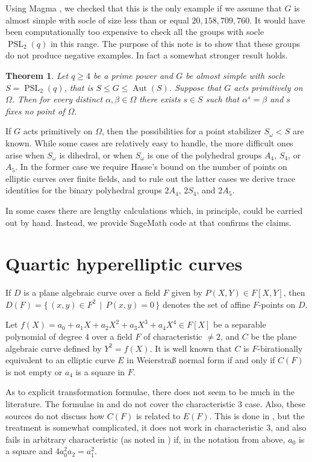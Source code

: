 \documentclass[12pt]{amsart}
\theoremstyle{plain}
\newtheorem{theorem}{Theorem}[section]
\theoremstyle{definition}
\numberwithin{equation}{section}
\newcommand*{\defset}[2]{\{\,#1\,\mid\,#2\,\}}
\DeclareMathOperator{\PSL}{PSL}
\DeclareMathOperator{\aut}{Aut}
\begin{document}
Using Magma \cite{magma}, we checked that this is the only example if
we assume that $G$ is almost simple with socle of size less than or
equal $20{,}158{,}709{,}760$. It would have been computationally too
expensive to check all the groups with socle $\PSL_2(q)$ in this
range. The purpose of this note is to show that these groups do not
produce negative examples. In fact a somewhat stronger result holds.
\begin{theorem}\label{t:main}
  Let $q\ge4$ be a prime power and $G$ be almost simple with socle
  $S=\PSL_2(q)$, that is $S\le G\le\aut(S)$. Suppose that $G$ acts
  primitively on $\Omega$. Then for every distinct
  $\alpha, \beta\in\Omega$ there exists $s\in S$ such that
  $\alpha^s=\beta$ and $s$ fixes no point of $\Omega$.
\end{theorem}
If $G$ acts primitively on $\Omega$, then the possibilities for a point
stabilizer $S_\omega < S$ are known. While some cases are relatively
easy to handle, the more difficult ones arise when $S_\omega$ is
dihedral, or when $S_\omega$ is one of the polyhedral groups $A_4$,
$S_4$, or $A_5$. In the former case we require Hasse’s bound on the
number of points on elliptic curves over finite fields, and to rule out
the latter cases we derive trace identities for the binary polyhedral
groups $2A_4$, $2S_4$, and $2A_5$.

In some cases there are lengthy calculations which, in principle,
could be carried out by hand. Instead, we provide SageMath code at
\cite{dera_psl2_verify} that confirms the claims.
\section{Quartic hyperelliptic curves}
If $D$ is a plane algebraic curve over a field $F$ given by
$P(X, Y)\in F[X, Y]$, then $D(F)=\defset{(x, y)\in F^2}{P(x,y)=0}$
denotes the set of affine $F$-points on $D$.

Let $f(X)=a_0+a_1X+a_2X^2+a_3X^3+a_4X^4\in F[X]$ be a separable
polynomial of degree $4$ over a field $F$ of characteristic $\ne2$,
and $C$ be the plane algebraic curve defined by $Y^2=f(X)$. It is well
known that $C$ is $F$-birationally equivalent to an elliptic curve $E$
in Weierstraß normal form if and only if $C(F)$ is not empty or $a_4$
is a square in $F$.

As to explicit transformation formulae, there does not seem to be much
in the literature. The formulae in \cite[Chapter 10, Theorem
2]{Mordell:DE} and \cite{weil___remarques} do not cover the
characteristic $3$ case. Also, these sources do not discuss how $C(F)$
is related to $E(F)$. This is done in \cite[Section 3]{harada_lang},
but the treatment is somewhat complicated, it does not work in
characteristic $3$, and also fails in arbitrary characteristic (as
noted in \cite{connell___addendum}) if, in the notation from above,
$a_0$ is a square and $4a_0^2a_2=a_1^2$.
\end{document}
